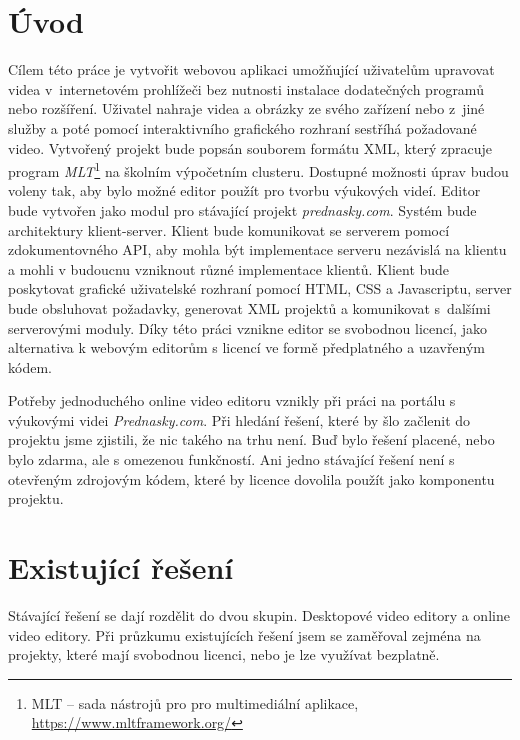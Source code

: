\chapter{Úvod}
Cílem této práce je vytvořit webovou aplikaci umožňující uživatelům upravovat videa v~internetovém prohlížeči bez nutnosti instalace dodatečných programů nebo rozšíření. Uživatel nahraje videa a obrázky ze svého zařízení nebo z~jiné služby a poté pomocí interaktivního grafického rozhraní sestříhá požadované video. Vytvořený projekt bude popsán souborem formátu XML, který zpracuje program \textit{MLT}\footnote{MLT -- sada nástrojů pro pro multimediální aplikace, \url{https://www.mltframework.org/}} na školním výpočetním clusteru. Dostupné možnosti úprav budou voleny tak, aby bylo možné editor použít pro tvorbu výukových videí. Editor bude vytvořen jako modul pro stávající projekt \textit{prednasky.com}.
Systém bude architektury klient-server. Klient bude komunikovat se serverem pomocí zdokumentovného API, aby mohla být implementace serveru nezávislá na klientu a mohli v budoucnu vzniknout různé implementace klientů. Klient bude poskytovat grafické uživatelské rozhraní pomocí HTML, CSS a Javascriptu, server bude obsluhovat požadavky, generovat XML projektů a komunikovat s~dalšími serverovými moduly. Díky této práci vznikne editor se svobodnou licencí, jako alternativa k webovým editorům s licencí ve formě předplatného a uzavřeným kódem.

Potřeby jednoduchého online video editoru vznikly při práci na portálu s výukovými videi \textit{Prednasky.com}. Při hledání řešení, které by šlo začlenit do projektu jsme zjistili, že nic takého na trhu není. Buď bylo řešení placené, nebo bylo zdarma, ale s omezenou funkčností. Ani jedno stávající řešení není s otevřeným zdrojovým kódem, které by licence dovolila použít jako komponentu projektu.

\chapter{Existující řešení}
Stávající řešení se dají rozdělit do dvou skupin. Desktopové video editory a online video editory. Při průzkumu existujících řešení jsem se zaměřoval zejména na projekty, které mají svobodnou licenci, nebo je lze využívat bezplatně.

